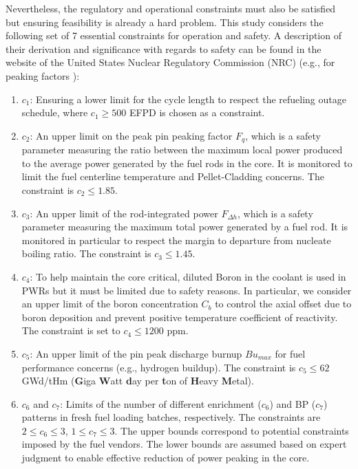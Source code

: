 \documentclass[a4paper]{article}
\begin{document}
Nevertheless, the regulatory and operational constraints must also be satisfied but ensuring feasibility is already a hard problem. This study considers the following set of 7 essential constraints for operation and safety. A description of their derivation and significance with regards to safety can be found in the website of the United States Nuclear Regulatory Commission (NRC) (e.g., for peaking factors \cite{nrcXXXX0523}): 
\begin{enumerate}
    \item
	$c_1$: Ensuring a lower limit for the cycle length to respect the refueling outage schedule, where $c_1 \geq 500$ EFPD is chosen as a constraint.
	\item
	$c_2$: An upper limit on the peak pin peaking factor $F_q$, which is a safety parameter measuring the ratio between the maximum local power produced to the average power generated by the fuel rods in the core. It is monitored to limit the fuel centerline temperature and Pellet-Cladding concerns. The constraint is $c_2 \leq 1.85$.
	\item
	$c_3$: An upper limit of the rod-integrated power $F_{\Delta h}$, which is a safety parameter measuring the maximum total power generated by a fuel rod. It is monitored in particular to respect the margin to departure from nucleate boiling ratio. The constraint is $c_3 \leq 1.45$.
	\item
	$c_4$: To help
maintain the core critical, diluted Boron in the coolant is used in PWRs but it must be limited due to safety reasons. In particular, we consider an upper limit of the boron concentration $C_b$ to control the axial offset due to boron deposition and prevent positive temperature coefficient of reactivity. The constraint is set to $c_4 \leq 1200$ ppm.
	\item
	$c_5$: An upper limit of the pin peak discharge burnup $Bu_{max}$ for fuel performance concerns (e.g., hydrogen buildup). The constraint is $c_5 \leq 62$ GWd/tHm (\textbf{G}iga \textbf{W}att \textbf{d}ay per \textbf{t}on of \textbf{H}eavy \textbf{M}etal).
	\item
	$c_6$ and $c_7$: Limits of the number of different enrichment ($c_6$) and BP ($c_7$) patterns in fresh fuel loading batches, respectively. The constraints are $2 \le c_6 \le 3$, $1 \le c_7  \le 3$. The upper bounds correspond to potential constraints imposed by the fuel vendors. The lower bounds are assumed based on expert judgment to enable effective reduction of power peaking in the core.
\end{enumerate}
 
\end{document}
